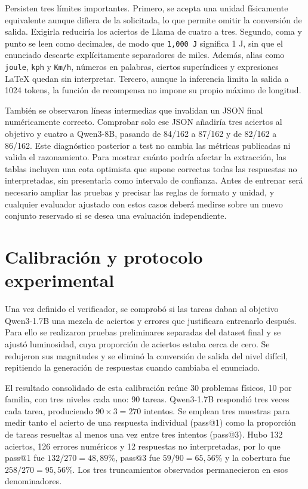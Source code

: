 Persisten tres límites importantes. Primero, se acepta una unidad físicamente
equivalente aunque difiera de la solicitada, lo que permite omitir la conversión
de salida. Exigirla reduciría los aciertos de Llama de cuatro a tres. Segundo,
coma y punto se leen como decimales, de modo que \texttt{1,000 J} significa 1 J,
sin que el enunciado descarte explícitamente separadores de miles. Además, alias
como \texttt{joule}, \texttt{kph} y \texttt{Km/h}, números en palabras, ciertos
superíndices y expresiones LaTeX quedan sin interpretar. Tercero, aunque la
inferencia limita la salida a 1024 tokens, la función de recompensa no impone
su propio máximo de longitud.

También se observaron líneas intermedias que invalidan un JSON final
numéricamente correcto. Comprobar solo ese JSON añadiría tres aciertos al
objetivo y cuatro a Qwen3-8B, pasando de 84/162 a 87/162 y de 82/162 a 86/162.
Este diagnóstico posterior a test no cambia las métricas publicadas ni valida
el razonamiento. Para mostrar cuánto podría afectar la extracción, las tablas
incluyen una cota optimista que supone correctas todas las respuestas no
interpretadas, sin presentarla como intervalo de confianza. Antes de entrenar
será necesario ampliar las pruebas y precisar las reglas de formato y unidad,
y cualquier evaluador ajustado con estos casos deberá medirse sobre un nuevo
conjunto reservado si se desea una evaluación independiente.

\section{Calibración y protocolo experimental}
Una vez definido el verificador, se comprobó si las tareas daban al objetivo
Qwen3-1.7B una mezcla de aciertos y errores que justificara entrenarlo después.
Para ello se realizaron pruebas preliminares separadas del dataset final y se
ajustó luminosidad, cuya proporción de aciertos estaba cerca de cero. Se
redujeron sus magnitudes y se eliminó la conversión de salida del nivel difícil,
repitiendo la generación de respuestas cuando cambiaba el enunciado.

El resultado consolidado de esta calibración reúne 30 problemas físicos,
10 por familia, con tres niveles cada uno: 90 tareas. Qwen3-1.7B respondió
tres veces cada tarea, produciendo $90\times3=270$ intentos. Se emplean tres
muestras para medir tanto el acierto de una respuesta individual (pass@1)
como la proporción de tareas resueltas al menos una vez entre tres intentos
(pass@3). Hubo 132 aciertos, 126 errores numéricos y 12 respuestas no
interpretadas, por lo que pass@1 fue $132/270=48{,}89\%$, pass@3 fue
$59/90=65{,}56\%$ y la cobertura fue $258/270=95{,}56\%$. Los tres
truncamientos observados permanecieron en esos denominadores.

